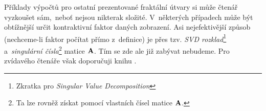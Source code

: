 Příklady výpočtů pro ostatní prezentované fraktální útvary si může čtenář vyzkoušet sám,~neboť nejsou nikterak složité. V~některých případech může být obtížnější určit kontraktivní faktor daných zobrazení. Asi nejefektivější způsob (nechceme-li faktor počítat přímo z~definice) je přes tzv. \emph{SVD rozklad}\footnote{Zkratka pro \emph{Singular Value Decomposition}} a~\emph{singulární čísla}\footnote{Ta lze rovněž získat pomocí vlastních čísel matice $\mathbf{A}$.} matice $\mathbf{A}$. Tím se zde ale již zabývat nebudeme. Pro zvídavého čtenáře však doporučuji knihu \cite{Hladik2019}.
